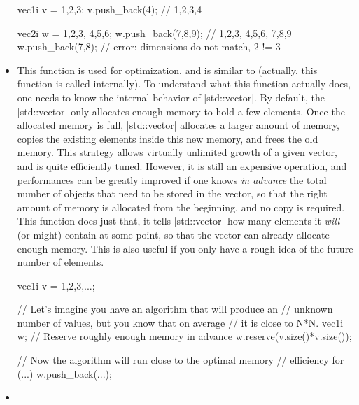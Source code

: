 \documentclass[12pt]{report}
\newcommand{\stdvec}{\cppinline|std::vector|\xspace}
\newenvironment{example}
{
    \begin{mdframed}[style=example,frametitle={Example}]
}
{
    \end{mdframed}
}
\begin{document}
\begin{itemize}
\begin{example}
\begin{cppcode}
vec1i v = {1,2,3};
v.push_back(4); // {1,2,3,4}

vec2i w = {{1,2,3}, {4,5,6}};
w.push_back({7,8,9}); // {{1,2,3}, {4,5,6}, {7,8,9}}
w.push_back({7,8});   // error: dimensions do not match, 2 != 3
\end{cppcode}
\end{example}

\item {}

This function is used for optimization, and is similar to  (actually, this function is called internally). To understand what this function actually does, one needs to know the internal behavior of \stdvec. By default, the \stdvec only allocates enough memory to hold a few elements. Once the allocated memory is full, \stdvec allocates a larger amount of memory, copies the existing elements inside this new memory, and frees the old memory. This strategy allows virtually unlimited growth of a given vector, and is quite efficiently tuned. However, it is still an expensive operation, and performances can be greatly improved if one knows \emph{in advance} the total number of objects that need to be stored in the vector, so that the right amount of memory is allocated from the beginning, and no copy is required. This function does just that, it tells \stdvec how many elements it \emph{will} (or might) contain at some point, so that the vector can already allocate enough memory. This is also useful if you only have a rough idea of the future number of elements.

\begin{example}
\begin{cppcode}
vec1i v = {1,2,3,...};

// Let's imagine you have an algorithm that will produce an
// unknown number of values, but you know that on average
// it is close to N*N.
vec1i w;
// Reserve roughly enough memory in advance
w.reserve(v.size()*v.size());

// Now the algorithm will run close to the optimal memory
// efficiency
for (...) {
    w.push_back(...);
}
\end{cppcode}
\end{example}

\item {}


\end{itemize}
\end{document}
